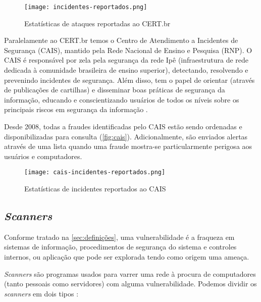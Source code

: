 \begin{figure}[!htb]
 \centering
 \caption{Estatísticas de ataques reportadas ao CERT.br}
 \texttt{[image: incidentes-reportados.png]}
 \label{fig:cert}
\end{figure}

Paralelamente ao CERT.br temos o Centro de Atendimento a Incidentes de Segurança (CAIS), mantido pela Rede Nacional de Ensino e Pesquisa (RNP). O CAIS é responsável por zela pela segurança da rede Ipê (infraestrutura de rede dedicada à comunidade brasileira de ensino superior), detectando, resolvendo e prevenindo incidentes de segurança. Além disso, tem o papel de orientar (através de publicações de cartilhas) e disseminar boas práticas de segurança da informação, educando e conscientizando usuários de todos os níveis sobre os principais riscos em segurança da informação \cite{cais}.

Desde 2008, todas a fraudes identificadas pelo CAIS estão sendo ordenadas e disponibilizadas para consulta (\autoref{fig:cais}). Adicionalmente, são enviados alertas através de uma lista quando uma fraude mostra-se particularmente perigosa aos usuários e computadores.

\begin{figure}[!htb]
 \centering
 \caption{Estatísticas de incidentes reportados ao CAIS}
 \texttt{[image: cais-incidentes-reportados.png]}
 \label{fig:cais}
\end{figure}

\subsection{\textit{Scanners}} \label{sec:scanners}

Conforme tratado na \autoref{sec:definições}, uma vulnerabilidade é a fraqueza em sistemas de informação, procedimentos de segurança do sistema e controles internos, ou aplicação que pode ser explorada tendo como origem uma ameaça. 

\textit{Scanners} são programas usados para varrer uma rede à procura de computadores (tanto pessoais como servidores) com alguma vulnerabilidade. Podemos dividir os \textit{scanners} em dois tipos \cite{univhacker}: 

